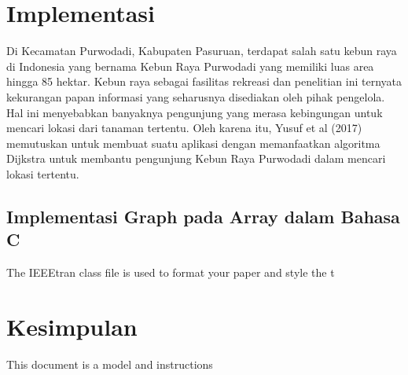 \documentclass[conference]{IEEEtran}
\begin{document}

\section{Implementasi}
Di Kecamatan Purwodadi, Kabupaten Pasuruan, terdapat
salah satu kebun raya di Indonesia yang bernama Kebun
Raya Purwodadi yang memiliki luas area hingga 85 hektar.
Kebun raya sebagai fasilitas rekreasi dan penelitian ini ternyata
kekurangan papan informasi yang seharusnya disediakan oleh
pihak pengelola. Hal ini menyebabkan banyaknya pengunjung
yang merasa kebingungan untuk mencari lokasi dari tanaman
tertentu. Oleh karena itu, Yusuf et al (2017) memutuskan
untuk membuat suatu aplikasi dengan memanfaatkan algoritma
Dijkstra untuk membantu pengunjung Kebun Raya Purwodadi
dalam mencari lokasi tertentu.

\subsection{Implementasi Graph pada Array dalam Bahasa C}
The IEEEtran class file is used to format your paper and style the t

\section{Kesimpulan}
This document is a model and instructions



\end{document}
